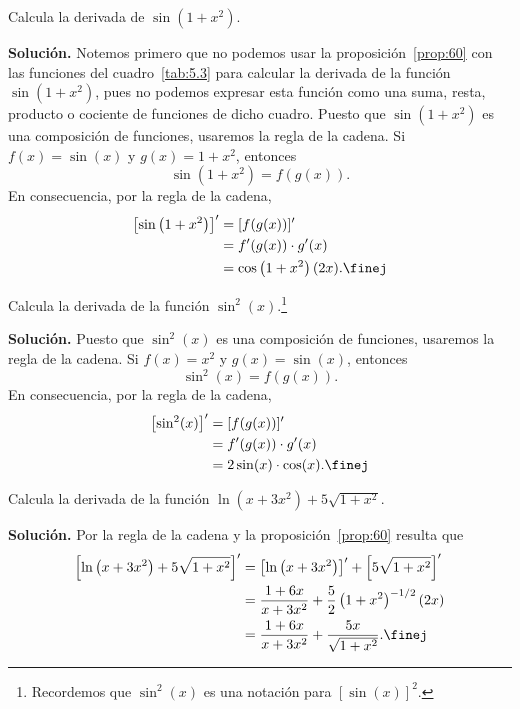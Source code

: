 \documentclass[12pt,a4paper]{book}
\begin{document}
    \begin{ejemplo}\label{ejm:80}
        Calcula la derivada de $\sin\left(1+x^{2}\right)$.

        \textbf{Solución.} Notemos primero que no podemos usar la proposición~\ref{prop:60} con las
        funciones del cuadro~\ref{tab:5.3} para calcular la derivada de la función $\sin\left(1+x^{2}\right)$,
        pues no podemos expresar esta función como una suma, resta, producto o
        cociente de funciones de dicho cuadro. Puesto que $\sin\left(1+x^{2}\right)$ es una composición
        de funciones, usaremos la regla de la cadena. Si $f(x)=\sin(x)$ y
        $g(x)=1+x^{2}$, entonces
        \begin{equation*}
            \sin\left(1+x^{2}\right)=f(g(x)).
        \end{equation*}
        En consecuencia, por la regla de la cadena,
        \begin{align*}
            \left[\sin\left(1+x^{2}\right)\right]'&=[f(g(x))]'\\
            &=f'(g(x))\cdot g'(x)\\
            &=\cos\left(1+x^{2}\right)(2x).\finej
        \end{align*}
    \end{ejemplo}

    \begin{ejemplo}\label{ejm:81}
        Calcula la derivada de la función $\sin^{2}(x)$.\footnote{Recordemos que $\sin^{2}(x)$ es una notación para $[\sin(x)]^{2}$.}

        \textbf{Solución.} Puesto que $\sin^{2}(x)$ es una composición de funciones, usaremos
        la regla de la cadena. Si $f(x)=x^{2}$ y $g(x)=\sin(x)$, entonces
        \begin{equation*}
            \sin^{2}(x)=f(g(x)).
        \end{equation*}
        En consecuencia, por la regla de la cadena,
        \begin{align*}
            \left[\sin^{2}(x)\right]'&=[f(g(x))]'\\
            &=f'(g(x))\cdot g'(x)\\
            &=2\sin(x)\cdot\cos(x).\finej
        \end{align*}
    \end{ejemplo}

    \begin{ejemplo}\label{ejm:82}
        Calcula la derivada de la función $\ln\left(x+3x^{2}\right)+5\sqrt{1+x^{2}}$.

        \textbf{Solución.} Por la regla de la cadena y la proposición~\ref{prop:60} resulta que
        \begin{align*}
            \left[\ln\left(x+3x^{2}\right)+5\sqrt{1+x^{2}}\right]'&=\left[\ln\left(x+3x^{2}\right)\right]'+\left[5\sqrt{1+x^{2}}\right]'\\
            &=\frac{1+6x}{x+3x^{2}}+\frac{5}{2}\left(1+x^{2}\right)^{-1/2}(2x)\\
            &=\frac{1+6x}{x+3x^{2}}+\frac{5x}{\sqrt{1+x^{2}}}.\finej
        \end{align*}
    \end{ejemplo}
\end{document}
